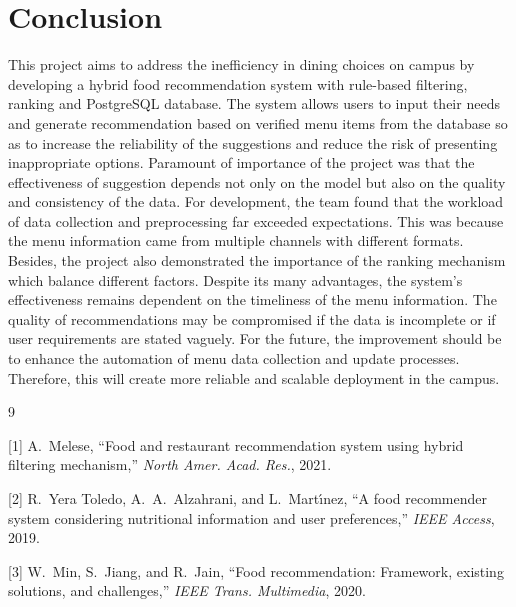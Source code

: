 \documentclass{article}
\begin{document}
\section{Conclusion}
This project aims to address the inefficiency in dining choices on campus by developing a hybrid food recommendation system with rule-based filtering, ranking and PostgreSQL database. The system allows users to input their needs and generate recommendation based on verified menu items from the database so as to increase the reliability of the suggestions and reduce the risk of presenting inappropriate options. Paramount of importance of the project was that the effectiveness of suggestion depends not only on the model but also on the quality and consistency of the data. For development, the team found that the workload of data collection and preprocessing far exceeded expectations. This was because the menu information came from multiple channels with different formats. Besides, the project also demonstrated the importance of the ranking mechanism which balance different factors. Despite its many advantages, the system’s effectiveness remains dependent on the timeliness of the menu information. The quality of recommendations may be compromised if the data is incomplete or if user requirements are stated vaguely. For the future, the improvement should be to enhance the automation of menu data collection and update processes. Therefore, this will create more reliable and scalable deployment in the campus.

\begin{thebibliography}{9}
\small

[1] A.~Melese, ``Food and restaurant recommendation system using hybrid filtering mechanism,'' \emph{North Amer. Acad. Res.}, 2021.

[2] R.~Yera Toledo, A.~A.~Alzahrani, and L.~Mart{\'\i}nez, ``A food recommender system considering nutritional information and user preferences,'' \emph{IEEE Access}, 2019.

[3] W.~Min, S.~Jiang, and R.~Jain, ``Food recommendation: Framework, existing solutions, and challenges,'' \emph{IEEE Trans. Multimedia}, 2020.

\end{thebibliography}

\end{document}
